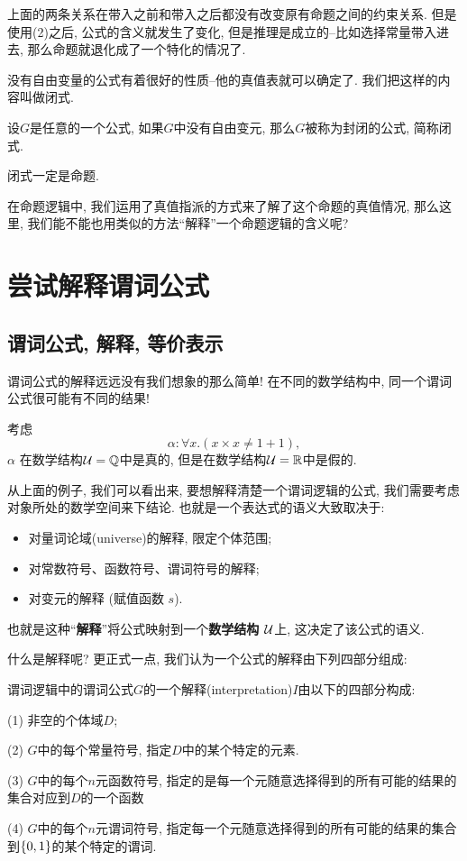 上面的两条关系在带入之前和带入之后都没有改变原有命题之间的约束关系. 但是使用(2)之后, 公式的含义就发生了变化, 但是推理是成立的--比如选择常量带入进去, 那么命题就退化成了一个特化的情况了. 

没有自由变量的公式有着很好的性质--他的真值表就可以确定了. 我们把这样的内容叫做闭式. 

\begin{definition}[闭式]
设$G$是任意的一个公式, 如果$G$中没有自由变元, 那么$G$被称为封闭的公式, 简称闭式. 	
\end{definition}

\begin{theorem}
	闭式一定是命题. 
\end{theorem}

在命题逻辑中, 我们运用了真值指派的方式来了解了这个命题的真值情况, 那么这里, 我们能不能也用类似的方法``解释''一个命题逻辑的含义呢? 

\section{尝试解释谓词公式}
\subsection{谓词公式, 解释, 等价表示}
谓词公式的解释远远没有我们想象的那么简单! 在不同的数学结构中, 同一个谓词公式很可能有不同的结果! 

\begin{example}
	考虑
	$$
	\alpha: \forall x.(x\times x \neq 1+1), 
	$$
	$\alpha$ 在数学结构$\mathcal U=\mathbb{Q} $中是真的, 但是在数学结构$\mathcal U=\mathbb{R}  $中是假的. 
\end{example}

从上面的例子, 我们可以看出来, 要想解释清楚一个谓词逻辑的公式, 我们需要考虑对象所处的数学空间来下结论. 也就是一个表达式的语义大致取决于: 

\begin{itemize}
  \item 对量词论域(universe)的解释, 限定个体范围;
  \item 对常数符号、函数符号、谓词符号的解释;
  \item 对变元的解释 (赋值函数 $s$).
\end{itemize}

也就是这种``{\bf 解释}''将公式映射到一个{\bf 数学结构 $\mathcal{U}$}上, 这决定了该公式的语义. 

什么是解释呢? 更正式一点, 我们认为一个公式的解释由下列四部分组成: 

\begin{definition}
	谓词逻辑中的谓词公式$G$的一个解释(interpretation)$I$由以下的四部分构成: 
	
	(1) 非空的个体域$D$;
	
	(2) $G$中的每个常量符号, 指定$D$中的某个特定的元素. 
	
	(3) $G$中的每个$n$元函数符号, 指定的是每一个元随意选择得到的所有可能的结果的集合对应到$D$的一个函数
	
	(4) $G$中的每个$n$元谓词符号, 指定每一个元随意选择得到的所有可能的结果的集合到$\{0,1\}$的某个特定的谓词. 
\end{definition}

